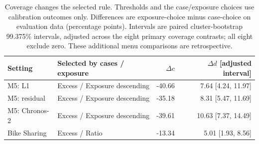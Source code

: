 \begin{table}[t]
\centering\small
\caption{Coverage changes the selected rule. Thresholds and the case/exposure choices use calibration outcomes only. Differences are exposure-choice minus case-choice on evaluation data (percentage points). Intervals are paired cluster-bootstrap 99.375\% intervals, adjusted across the eight primary coverage contrasts; all eight exclude zero. These additional menu comparisons are retrospective.}
\label{tab:policy-choice}
\begin{tabular}{llrr}
\toprule
Setting & Selected by cases / exposure & $\Delta c$ & $\Delta d$ [adjusted interval] \\
\midrule
M5: L1 & Excess / Exposure descending & -40.66 & 7.64 [4.24, 11.97] \\
M5: residual & Excess / Exposure descending & -35.18 & 8.31 [5.47, 11.69] \\
M5: Chronos-2 & Excess / Exposure descending & -39.61 & 10.63 [7.37, 14.49] \\
Bike Sharing & Excess / Ratio & -13.34 & 5.01 [1.93, 8.56] \\
\bottomrule
\end{tabular}
\end{table}
